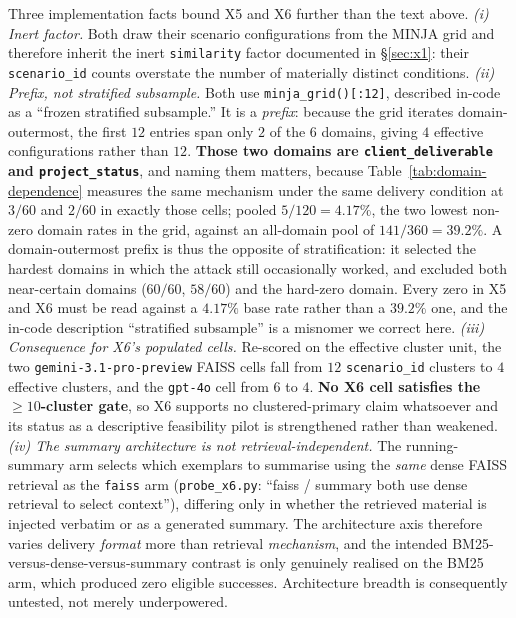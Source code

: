 \documentclass{article}
\begin{document}
Three implementation facts bound X5 and X6 further than the text above. \emph{(i) Inert factor.} Both draw their scenario configurations from the MINJA grid and therefore inherit the inert \texttt{similarity} factor documented in \S\ref{sec:x1}: their \texttt{scenario\_id} counts overstate the number of materially distinct conditions. \emph{(ii) Prefix, not stratified subsample.} Both use \texttt{minja\_grid()[:12]}, described in-code as a ``frozen stratified subsample.'' It is a \emph{prefix}: because the grid iterates domain-outermost, the first $12$ entries span only $2$ of the $6$ domains, giving $4$ effective configurations rather than $12$. \textbf{Those two domains are \texttt{client\_deliverable} and \texttt{project\_status}}, and naming them matters, because Table~\ref{tab:domain-dependence} measures the same mechanism under the same delivery condition at $3/60$ and $2/60$ in exactly those cells; pooled $5/120 = 4.17\%$, the two lowest non-zero domain rates in the grid, against an all-domain pool of $141/360 = 39.2\%$. A domain-outermost prefix is thus the opposite of stratification: it selected the hardest domains in which the attack still occasionally worked, and excluded both near-certain domains ($60/60$, $58/60$) and the hard-zero domain. Every zero in X5 and X6 must be read against a $4.17\%$ base rate rather than a $39.2\%$ one, and the in-code description ``stratified subsample'' is a misnomer we correct here. \emph{(iii) Consequence for X6's populated cells.} Re-scored on the effective cluster unit, the two \texttt{gemini-3.1-pro-preview} FAISS cells fall from $12$ \texttt{scenario\_id} clusters to $4$ effective clusters, and the \texttt{gpt-4o} cell from $6$ to $4$. \textbf{No X6 cell satisfies the ${\geq}10$-cluster gate}, so X6 supports no clustered-primary claim whatsoever and its status as a descriptive feasibility pilot is strengthened rather than weakened. \emph{(iv) The summary architecture is not retrieval-independent.} The running-summary arm selects which exemplars to summarise using the \emph{same} dense FAISS retrieval as the \texttt{faiss} arm (\texttt{probe\_x6.py}: ``faiss / summary both use dense retrieval to select context''), differing only in whether the retrieved material is injected verbatim or as a generated summary. The architecture axis therefore varies delivery \emph{format} more than retrieval \emph{mechanism}, and the intended BM25-versus-dense-versus-summary contrast is only genuinely realised on the BM25 arm, which produced zero eligible successes. Architecture breadth is consequently untested, not merely underpowered.
\end{document}
